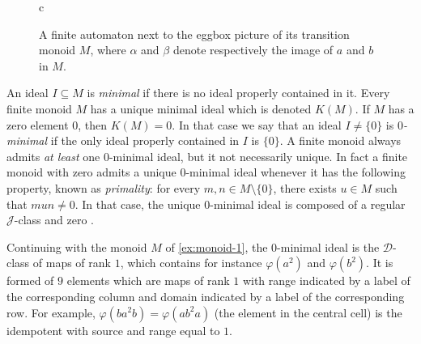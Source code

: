 \documentclass[a4paper,UKenglish,numberwithinsect,cleveref]{lipics-v2021}
\newcommand{\drawgrid}[3]{
            \foreach \i in {2,...,#1}
                \draw (#3-\i-1.north west) to (#3-\i-#1.north east);
            \foreach \i in {2,...,#2}
                \draw (#3-1-\i.north west) to (#3-#2-\i.south west);
            }
\newcommand{\JJ}{\mathrel{\mathscr{J}}}
\newcommand{\DD}{\mathrel{\mathscr{D}}}
\begin{document}
\begin{example}
\begin{figure}
\begin{tabular}{c}
  \end{tabular}
\caption{A finite automaton next to the eggbox picture of its transition monoid $M$, where $\alpha$ and $\beta$ denote respectively the image of $a$ and $b$ in $M$.}
    \label{figureMonoidM}
    \end{figure}
\end{example}

An ideal $I\subseteq M$ is \emph{minimal} if there is no ideal properly contained in it. Every finite monoid $M$ has a unique minimal ideal which is denoted $K(M)$. If $M$ has a zero element $0$, then $K(M)=0$. In that case we say that an ideal $I\ne\{0\}$ is \emph{$0$-minimal} if the only ideal properly contained in $I$ is $\{0\}$. A finite monoid always admits \emph{at least} one $0$-minimal ideal, but it not necessarily unique. In fact a finite monoid with zero admits a unique $0$-minimal ideal whenever it has the following property, known as \emph{primality}: for every $m,n\in M\setminus\{0\}$, there exists $u\in M$ such that $mun\ne 0$. In that case, the unique 0-minimal ideal is composed of a regular $\JJ$-class and zero \cite[Proposition 1.12.9]{BerstelPerrinReutenauer2009}.

\begin{example}\label{ex:monoid-2}
    Continuing with the monoid $M$ of \cref{ex:monoid-1}, the $0$-minimal ideal is the $\DD$-class of maps of rank $1$, which contains for instance $\varphi(a^2)$ and $\varphi(b^2)$. It is formed of $9$ elements which are maps of rank $1$ with range indicated by a label of the corresponding column and domain indicated by a label of the corresponding row. For example, $\varphi(ba^2b)=\varphi(ab^2a)$ (the element in the central cell) is the idempotent with source and range equal to $1$.
\end{example}
\end{document}
